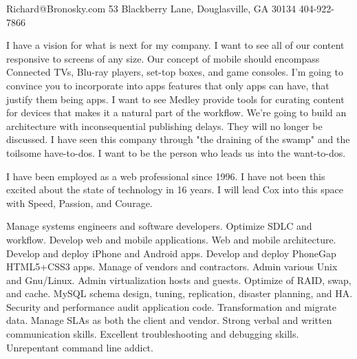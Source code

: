 \documentclass[10pt]{article}
\begin{document}
{Richard@Bronosky.com}
{53 Blackberry Lane, Douglasville, GA 30134}
{404-922-7866}

\begin{longtext}
    I have a vision for what is next for my company.
    I want to see all of our content responsive to screens of any size.
    Our concept of mobile should encompass Connected TVs, Blu-ray players, set-top boxes, and game consoles.
    I'm going to convince you to incorporate into apps features that only apps can have, that justify them being apps.
    I want to see Medley provide tools for curating content for devices that makes it a natural part of the workflow.
    We're going to build an architecture with inconsequential publishing delays. They will no longer be discussed.
    I have seen this company through "the draining of the swamp" and the toilsome have-to-dos. I want to be the person who leads us into the want-to-dos.
\end{longtext}
\shortspace
\begin{longtext}
    I have been employed as a web professional since 1996. I have not been this excited about the state of technology in 16 years. I will lead Cox into this space with Speed, Passion, and Courage.

\end{longtext}
\shortspace

\begin{longtext}
    Manage systems engineers and software developers.
    Optimize SDLC and workflow.
    Develop web and mobile applications.
    Web and mobile architecture.
    Develop and deploy iPhone and Android apps.
    Develop and deploy PhoneGap HTML5+CSS3 apps.
    Manage of vendors and contractors.
    Admin various Unix and Gnu/Linux.
    Admin virtualization hosts and guests.
    Optimize of RAID, swap, and cache.
    MySQL schema design, tuning, replication, disaster planning, and HA.
    Security and performance audit application code.
    Transformation and migrate data.
    Manage SLAs as both the client and vendor.
    Strong verbal and written communication skills.
    Excellent troubleshooting and debugging skills.
    Unrepentant command line addict.
\end{longtext}
\shortspace
\end{document}
